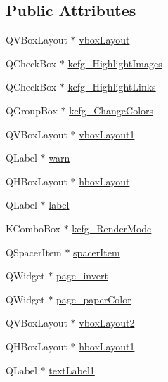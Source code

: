 \subsection*{Public Attributes}
\begin{DoxyCompactItemize}
\item 
Q\+V\+Box\+Layout $\ast$ \hyperlink{classUi__DlgAccessibilityBase_abb6e3109a50289ea7dd8791e43379d3e}{vbox\+Layout}
\item 
Q\+Check\+Box $\ast$ \hyperlink{classUi__DlgAccessibilityBase_a06bcf6b5838dd7dd61e796416b064b6b}{kcfg\+\_\+\+Highlight\+Images}
\item 
Q\+Check\+Box $\ast$ \hyperlink{classUi__DlgAccessibilityBase_aa5b4ab2a5fa80185e567cdfd3af9b3c8}{kcfg\+\_\+\+Highlight\+Links}
\item 
Q\+Group\+Box $\ast$ \hyperlink{classUi__DlgAccessibilityBase_ad69ec5ae9e5bad5756a57dac036500eb}{kcfg\+\_\+\+Change\+Colors}
\item 
Q\+V\+Box\+Layout $\ast$ \hyperlink{classUi__DlgAccessibilityBase_a83ac60339f9462b3a0571677794fae95}{vbox\+Layout1}
\item 
Q\+Label $\ast$ \hyperlink{classUi__DlgAccessibilityBase_ad66df65b95e80cd067b2e387ca0052b2}{warn}
\item 
Q\+H\+Box\+Layout $\ast$ \hyperlink{classUi__DlgAccessibilityBase_aeeb2f92b0e4ffd3005446d6624d5cafe}{hbox\+Layout}
\item 
Q\+Label $\ast$ \hyperlink{classUi__DlgAccessibilityBase_af08bc2aa14cf40f1a58ce05b6d98fef6}{label}
\item 
K\+Combo\+Box $\ast$ \hyperlink{classUi__DlgAccessibilityBase_a8eaeef4919006d3f9225067d5fa6f5e7}{kcfg\+\_\+\+Render\+Mode}
\item 
Q\+Spacer\+Item $\ast$ \hyperlink{classUi__DlgAccessibilityBase_a45af3bd1e7e9099df59dbc0cf5fe1c1a}{spacer\+Item}
\item 
Q\+Widget $\ast$ \hyperlink{classUi__DlgAccessibilityBase_a07a676aad0645e0d37a146419d0e4f38}{page\+\_\+invert}
\item 
Q\+Widget $\ast$ \hyperlink{classUi__DlgAccessibilityBase_acac9f9a8e065b0a8d203c932f816b0ef}{page\+\_\+paper\+Color}
\item 
Q\+V\+Box\+Layout $\ast$ \hyperlink{classUi__DlgAccessibilityBase_ac46065b12dbcbd56e25c4af9b2bed638}{vbox\+Layout2}
\item 
Q\+H\+Box\+Layout $\ast$ \hyperlink{classUi__DlgAccessibilityBase_a4d5ca775c1e4087efb03762789a88ec7}{hbox\+Layout1}
\item 
Q\+Label $\ast$ \hyperlink{classUi__DlgAccessibilityBase_a8487704a7e035affc3a6ef7f80572d21}{text\+Label1}

\end{DoxyCompactItemize}
